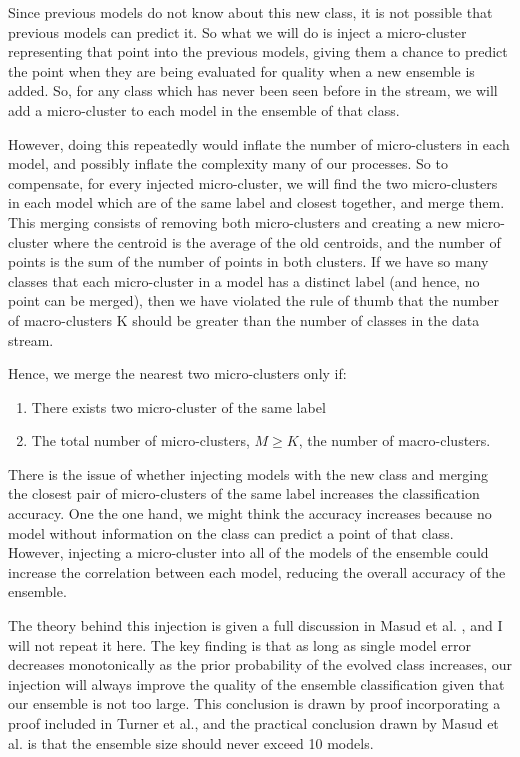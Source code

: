 \documentclass[12pt,a4paper,oneside]{report}
\begin{document}
Since previous models do not know about this new class, it is not possible that previous models can predict it. So what we will do is inject a micro-cluster representing that point into the previous models, giving them a chance to predict the point when they are being evaluated for quality when a new ensemble is added. So, for any class which has never been seen before in the stream, we will add a micro-cluster to each model in the ensemble of that class. 

However, doing this repeatedly would inflate the number of micro-clusters in each model, and possibly inflate the complexity many of our processes. So to compensate, for every injected micro-cluster, we will find the two micro-clusters in each model which are of the same label and closest together, and merge them. This merging consists of removing both micro-clusters and creating a new micro-cluster where the centroid is the average of the old centroids, and the number of points is the sum of the number of points in both clusters. If we have so many classes that each micro-cluster in a model has a distinct label (and hence, no point can be merged), then we have violated the rule of thumb that the number of macro-clusters K should be greater than the number of classes in the data stream. 

Hence, we merge the nearest two micro-clusters only if:

\begin{enumerate}
\item There exists two micro-cluster of the same label
\item The total number of micro-clusters, \( M \geq K \), the number of macro-clusters. 
\end{enumerate}

There is the issue of whether injecting models with the new class and merging the closest pair of micro-clusters of the same label increases the classification accuracy. One the one hand, we might think the accuracy increases because no model without information on the class can predict a point of that class. However, injecting a micro-cluster into all of the models of the ensemble could increase the correlation between each model, reducing the overall accuracy of the ensemble. \cite{Inject}

The theory behind this injection is given a full discussion in Masud et al. \cite{TechRep}, and I will not repeat it here. The key finding is that as long as single model error decreases monotonically as the prior probability of the evolved class increases, our injection will always improve the quality of the ensemble classification given that our ensemble is not too large. This conclusion is drawn by proof incorporating a proof included in Turner et al.\cite{Inject}, and the practical conclusion drawn by Masud et al.\cite{TechRep} is that the ensemble size should never exceed 10 models. 
\end{document}
